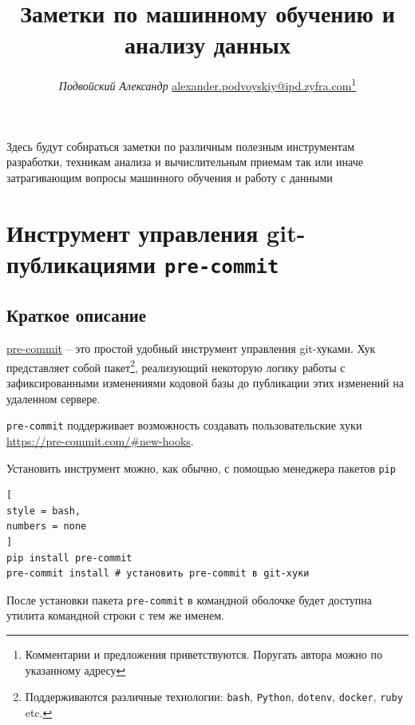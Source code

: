 \documentclass[%
	11pt,
	a4paper,
	utf8,
		]{article}
\begin{document}
\title{Заметки по машинному обучению и анализу данных}

\author{{\itshape Подвойский Александр} 
\href{mailto:alexander.podvoyskiy@ipd.zyfra.com}{\ttfamily alexander.podvoyskiy@ipd.zyfra.com}\footnote{Комментарии и предложения приветствуются. Поругать автора можно по указанному адресу}}

\date{}
\maketitle

\thispagestyle{fancy}

Здесь будут собираться заметки по различным полезным инструментам разработки, техникам анализа и вычислительным приемам так или иначе затрагивающим вопросы машинного обучения и работу с данными



\tableofcontents

\section{Инструмент управления git-публикациями \texttt{pre-commit}}

\subsection{Краткое описание}

\href{https://pre-commit.com/#new-hooks}{\ttfamily  pre-commit} -- это простой удобный инструмент управления git-хуками. Хук представляет собой пакет\footnote{Поддерживаются различные технологии: \texttt{bash}, \texttt{Python}, \texttt{dotenv}, \texttt{docker}, \texttt{ruby} etc.}, реализующий некоторую логику работы с зафиксированными изменениями кодовой базы до публикации этих изменений на удаленном сервере.

\texttt{pre-commit} поддерживает возможность создавать пользовательские хуки \url{https://pre-commit.com/#new-hooks}.

Установить инструмент можно, как обычно, с помощью менеджера пакетов \texttt{pip}
\begin{lstlisting}[
style = bash,
numbers = none	
]
pip install pre-commit
pre-commit install # установить pre-commit в git-хуки
\end{lstlisting}

После установки пакета \texttt{pre-commit} в командной оболочке будет доступна утилита командной строки с тем же именем.
\end{document}
